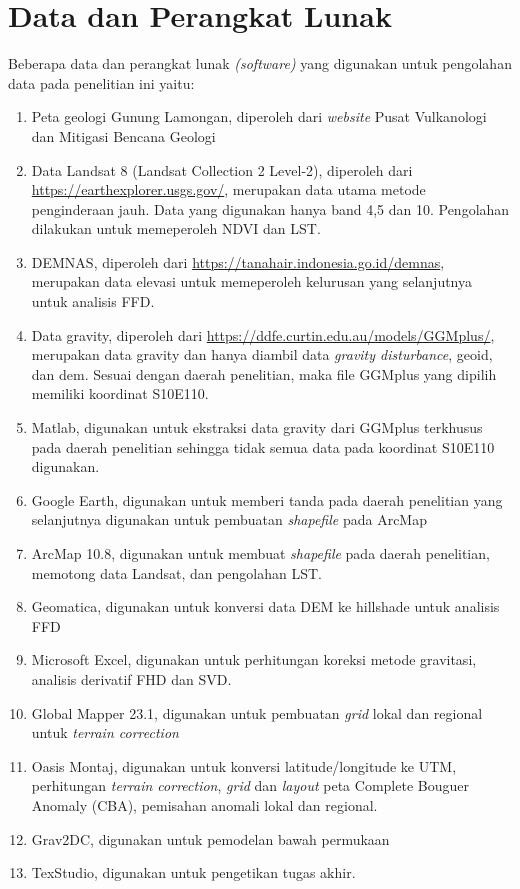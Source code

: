 \section{Data dan Perangkat Lunak}
\hspace{25pt} Beberapa data dan perangkat lunak \textit{(software)} yang digunakan untuk pengolahan data pada penelitian ini yaitu:
\begin{enumerate}
	\item Peta geologi Gunung Lamongan, diperoleh dari \textit{website} Pusat Vulkanologi dan Mitigasi Bencana Geologi
	\item Data Landsat 8 (Landsat Collection 2 Level-2), diperoleh dari \href{https://earthexplorer.usgs.gov/}{https://earthexplorer.usgs.gov/}, merupakan data utama metode penginderaan jauh. Data yang digunakan hanya band 4,5 dan 10. Pengolahan dilakukan untuk memeperoleh NDVI dan LST.\sloppy

	\item DEMNAS, diperoleh dari \href{https://tanahair.indonesia.go.id/demnas}{https://tanahair.indonesia.go.id/demnas}, merupakan data elevasi untuk memeperoleh kelurusan yang selanjutnya untuk analisis FFD.
	
	\item Data gravity, diperoleh dari \href{https://ddfe.curtin.edu.au/models/GGMplus/}{https://ddfe.curtin.edu.au/models/GGMplus/}, merupakan data gravity dan hanya diambil data \textit{gravity disturbance}, geoid, dan dem. Sesuai dengan daerah penelitian, maka file GGMplus yang dipilih memiliki koordinat S10E110.
	
	\item Matlab, digunakan untuk ekstraksi data gravity dari GGMplus terkhusus pada daerah penelitian sehingga tidak semua data pada koordinat S10E110 digunakan.
	
	\item Google Earth, digunakan untuk memberi tanda pada daerah penelitian yang selanjutnya digunakan untuk pembuatan \textit{shapefile} pada ArcMap
	\item ArcMap 10.8, digunakan untuk membuat \textit{shapefile} pada daerah penelitian, memotong data Landsat, dan pengolahan LST.
	\item Geomatica, digunakan untuk konversi data DEM ke hillshade untuk analisis FFD
	\item Microsoft Excel, digunakan untuk perhitungan koreksi metode gravitasi, analisis derivatif FHD dan SVD.
	\item Global Mapper 23.1, digunakan untuk pembuatan \textit{grid} lokal dan regional untuk \textit{terrain correction}
	\item Oasis Montaj, digunakan untuk konversi latitude/longitude ke UTM, perhitungan \textit{terrain correction}, \textit{grid} dan \textit{layout} peta Complete Bouguer Anomaly (CBA), pemisahan anomali lokal dan regional.
	\item Grav2DC, digunakan untuk pemodelan bawah permukaan
	\item TexStudio, digunakan untuk pengetikan tugas akhir.
\end{enumerate}
